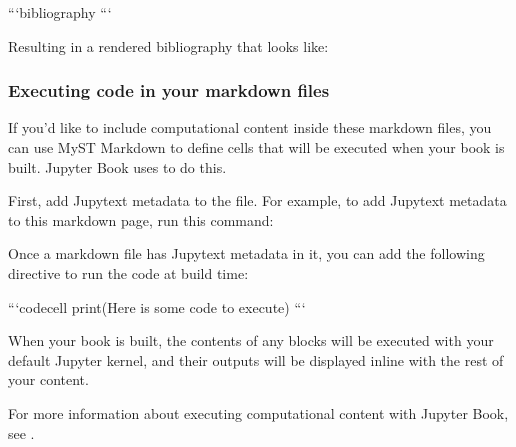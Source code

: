\documentclass[letterpaper,10pt,english]{jupyterBook}
\begin{document}
\begin{sphinxVerbatim}[commandchars=\\\{\}]
```\PYGZob{}bibliography\PYGZcb{}
```
\end{sphinxVerbatim}

\sphinxAtStartPar
Resulting in a rendered bibliography that looks like:

\sphinxAtStartPar



\subsubsection{Executing code in your markdown files}
\label{\detokenize{markdown:executing-code-in-your-markdown-files}}
\sphinxAtStartPar
If you’d like to include computational content inside these markdown files,
you can use MyST Markdown to define cells that will be executed when your
book is built. Jupyter Book uses  to do this.

\sphinxAtStartPar
First, add Jupytext metadata to the file. For example, to add Jupytext metadata
to this markdown page, run this command:

\begin{sphinxVerbatim}[commandchars=\\\{\}]
   
\end{sphinxVerbatim}

\sphinxAtStartPar
Once a markdown file has Jupytext metadata in it, you can add the following
directive to run the code at build time:

\begin{sphinxVerbatim}[commandchars=\\\{\}]
```\PYGZob{}code\PYGZhy{}cell\PYGZcb{}
print(\PYGZdq{}Here is some code to execute\PYGZdq{})
```
\end{sphinxVerbatim}

\sphinxAtStartPar
When your book is built, the contents of any  blocks will be
executed with your default Jupyter kernel, and their outputs will be displayed
in\sphinxhyphen{}line with the rest of your content.

\sphinxAtStartPar
For more information about executing computational content with Jupyter Book,
see .
\end{document}
